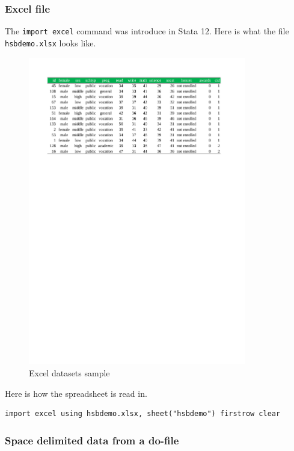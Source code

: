 \documentclass{article}
\begin{document}
\subsubsection{Excel file}
The \lstinline{import excel} command was introduce in Stata 12. Here is what the file \lstinline{hsbdemo.xlsx} looks like.

\begin{figure}[htbp]
\centering
\includegraphics[width=0.85\textwidth]{hsbdemo.pdf}
\caption{Excel datasets sample}
\end{figure}

Here is how the spreadsheet is read in.

\begin{lstlisting}
import excel using hsbdemo.xlsx, sheet("hsbdemo") firstrow clear
\end{lstlisting}

\subsubsection{Space delimited data from a do-file}
\end{document}
